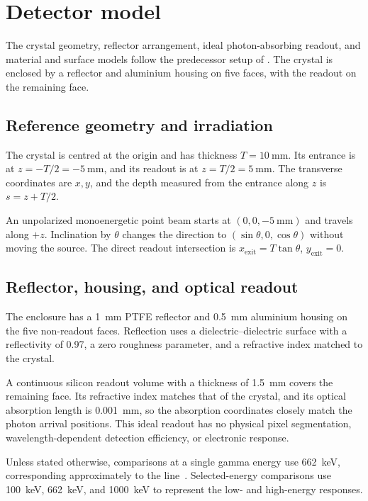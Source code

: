 \section{Detector model}

The crystal geometry, reflector arrangement, ideal photon-absorbing readout, and  material and surface models follow the predecessor setup of \textcite[pp.~21--23]{ovsiannikova2020light}. The crystal is enclosed by a reflector and aluminium housing on five faces, with the readout on the remaining face.

\subsection{Reference geometry and irradiation}

The  crystal is centred at the origin and has thickness $T=\qty{10}{\milli\metre}$. Its entrance is at $z=-T/2=\qty{-5}{\milli\metre}$, and its readout is at $z=T/2=\qty{5}{\milli\metre}$. The transverse coordinates are $x,y$, and the depth measured from the entrance along $z$ is $s=z+T/2$.

An unpolarized monoenergetic point beam starts at $(0,0,-\qty{5}{\milli\metre})$ and travels along $+z$. Inclination by $\theta$ changes the direction to $(\sin\theta,0,\cos\theta)$ without moving the source. The direct readout intersection is $x_{\mathrm{exit}}=T\tan\theta$, $y_{\mathrm{exit}}=0$.

\subsection{Reflector, housing, and optical readout}

The enclosure has a \qty{1}{\milli\metre} PTFE reflector and \qty{0.5}{\milli\metre} aluminium housing on the five non-readout faces. Reflection uses a dielectric--dielectric surface with a reflectivity of 0.97, a zero roughness parameter, and a refractive index matched to the crystal.

A continuous silicon readout volume with a thickness of \qty{1.5}{\milli\metre} covers the remaining face. Its refractive index matches that of the crystal, and its optical absorption length is \qty{0.001}{\milli\metre}, so the absorption coordinates closely match the photon arrival positions. This ideal readout has no physical pixel segmentation, wavelength-dependent detection efficiency, or electronic response.

Unless stated otherwise, comparisons at a single gamma energy use \qty{662}{\kilo\electronvolt}, corresponding approximately to the  line~\parencite[section 2.2]{lnhb2023cs137}. Selected-energy comparisons use \qty{100}{\kilo\electronvolt}, \qty{662}{\kilo\electronvolt}, and \qty{1000}{\kilo\electronvolt} to represent the low- and high-energy responses.
